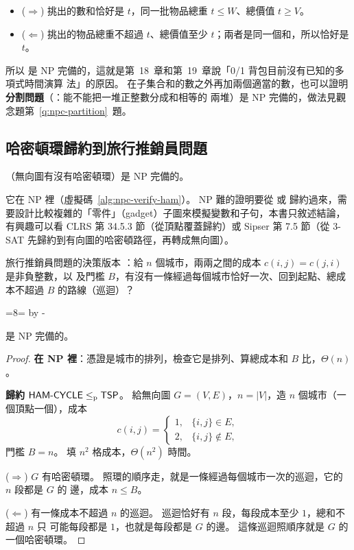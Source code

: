\begin{itemize}
\item ($\Rightarrow$) 挑出的數和恰好是 $t$，同一批物品總重 $t \le W$、總價值 $t \ge V$。
\item ($\Leftarrow$) 挑出的物品總重不超過 $t$、總價值至少 $t$；兩者是同一個和，所以恰好是 $t$。
\end{itemize}

所以  是 NP 完備的，這就是第~18~章和第~19~章說「0/1 背包目前沒有已知的多項式時間演算
法」的原因。 在子集合和的數之外再加兩個適當的數，也可以證明\textbf{分割問題}（：能不能把一堆正整數分成和相等的
兩堆）是 NP 完備的，做法見觀念題第~\ref{q:npc-partition}~題。

\subsection{哈密頓環歸約到旅行推銷員問題}
\label{sec:npc-tsp}

\begin{theorem}[Karp 1972]
\label{thm:npc-ham}
（無向圖有沒有哈密頓環）是 NP 完備的。
\end{theorem}

它在 NP 裡（虛擬碼~\ref{alg:npc-verify-ham}）。 NP 難的證明要從  或 
歸約過來，需要設計比較複雜的「零件」（gadget）子圖來模擬變數和子句，本書只敘述結論，有興趣可以看
CLRS 第 34.5.3 節（從頂點覆蓋歸約）或 Sipser 第 7.5 節（從 3-SAT 先歸約到有向圖的哈密頓路徑，再轉成無向圖）。

旅行推銷員問題的決策版本 ：給 $n$ 個城市，兩兩之間的成本 $c(i, j) = c(j, i)$ 是非負整數，以
及門檻 $B$，有沒有一條經過每個城市恰好一次、回到起點、總成本不超過 $B$ 的路線（巡迴）？

\par{}
\begingroup{}=8\baselineskip {}=\pagegoal \advance{} by -\pagetotal
\ifdim\dimen0>\dimen2 \ifdim\dimen2>0pt \vfil\fi \break\fi\endgroup
\begin{theorem}
\label{thm:npc-tsp}
 是 NP 完備的。
\end{theorem}

\begin{proof}
\textbf{在 NP 裡}：憑證是城市的排列，檢查它是排列、算總成本和 $B$ 比，$\Theta(n)$。

\textbf{歸約 $\textsf{HAM-CYCLE} \le_{\mathrm{p}} \textsf{TSP}$}。 給無向圖 $G = (V, E)$，$n = |V|$，造 $n$
個城市（一個頂點一個），成本
\[
c(i, j) = \begin{cases} 1, & \{i, j\} \in E, \\ 2, & \{i, j\} \notin E, \end{cases}
\]
門檻 $B = n$。 填 $n^2$ 格成本，$\Theta(n^2)$ 時間。

($\Rightarrow$) $G$ 有哈密頓環。 照環的順序走，就是一條經過每個城市一次的巡迴，它的 $n$ 段都是 $G$ 的
邊，成本 $n \le B$。

($\Leftarrow$) 有一條成本不超過 $n$ 的巡迴。 巡迴恰好有 $n$ 段，每段成本至少 $1$，總和不超過 $n$ 只
可能每段都是 $1$，也就是每段都是 $G$ 的邊。 這條巡迴照順序就是 $G$ 的一個哈密頓環。
\end{proof}

